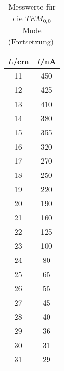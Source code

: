 \begin{table}[htp]
	\begin{center}
    \caption{Messwerte für die $TEM_{0,0}$ Mode (Fortsetzung).}
    \label{tab:tem01b}
		\begin{tabular}{cc}
		\toprule
			{$L$/cm} & {$I$/nA}\\
			\midrule
      11 & 450\\
      12 & 425\\
      13 & 410\\
      14 & 380\\
      15 & 355\\
      16 & 320\\
      17 & 270\\
      18 & 250\\
      19 & 220\\
      20 & 190\\
      21 & 160\\
      22 & 125\\
      23 & 100\\
      24 & 80\\
      25 & 65\\
      26 & 55\\
      27 & 45\\
      28 & 40\\
      29 & 36\\
      30 & 31\\
      31 & 29\\
      \bottomrule
    \end{tabular}
  \end{center}
\end{table}

